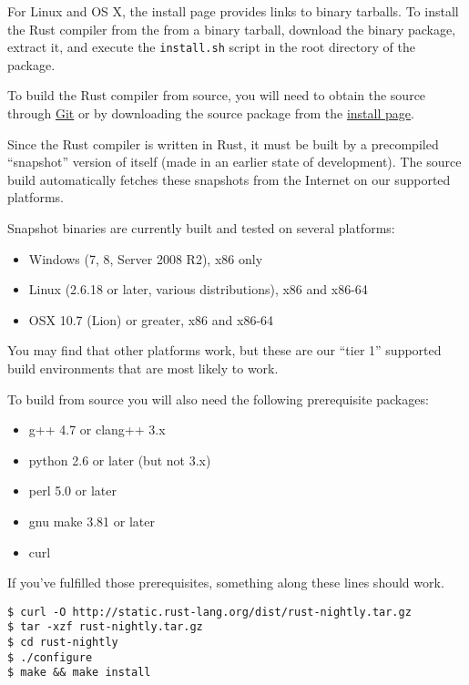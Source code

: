 \documentclass[]{article}
\begin{document}
For Linux and OS X, the install page provides links to binary tarballs.
To install the Rust compiler from the from a binary tarball, download
the binary package, extract it, and execute the \texttt{install.sh}
script in the root directory of the package.

To build the Rust compiler from source, you will need to obtain the
source through \href{https://github.com/rust-lang/rust.git}{Git} or by
downloading the source package from the
\href{http://www.rust-lang.org/install.html}{install page}.

Since the Rust compiler is written in Rust, it must be built by a
precompiled ``snapshot'' version of itself (made in an earlier state of
development). The source build automatically fetches these snapshots
from the Internet on our supported platforms.

Snapshot binaries are currently built and tested on several platforms:

\begin{itemize}
\itemsep1pt\parskip0pt
\item
  Windows (7, 8, Server 2008 R2), x86 only
\item
  Linux (2.6.18 or later, various distributions), x86 and x86-64
\item
  OSX 10.7 (Lion) or greater, x86 and x86-64
\end{itemize}

You may find that other platforms work, but these are our ``tier 1''
supported build environments that are most likely to work.

To build from source you will also need the following prerequisite
packages:

\begin{itemize}
\itemsep1pt\parskip0pt
\item
  g++ 4.7 or clang++ 3.x
\item
  python 2.6 or later (but not 3.x)
\item
  perl 5.0 or later
\item
  gnu make 3.81 or later
\item
  curl
\end{itemize}

If you've fulfilled those prerequisites, something along these lines
should work.

\begin{verbatim}
$ curl -O http://static.rust-lang.org/dist/rust-nightly.tar.gz
$ tar -xzf rust-nightly.tar.gz
$ cd rust-nightly
$ ./configure
$ make && make install
\end{verbatim}
\end{document}
